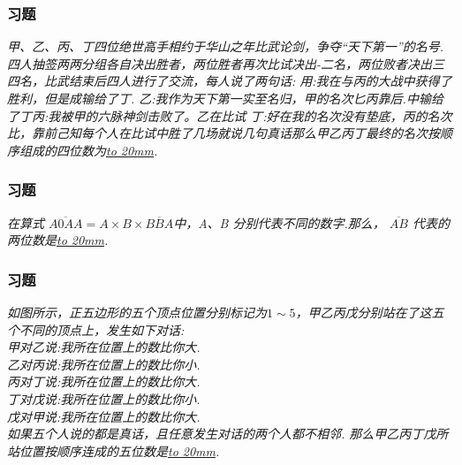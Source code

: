 \begin{frame}
    \frametitle{习题\theframecounter}
    \vspace*{-1cm}
    \textit{甲、乙、丙、丁四位绝世高手相约于华山之年比武论剑，争夺“天下第一”的名号.四人抽签两两分组各自决出胜者，两位胜者再次比试决出-二名，两位败者决出三四名，比武结束后四人进行了交流，每人说了两句话:
用:我在与丙的大战中获得了胜利，但是成输给了丁.
乙:我作为天下第一实至名归，甲的名次匕丙靠后.中输给了丁丙:我被甲的六脉神剑击败了。乙在比试
丁:好在我的名次没有垫底，丙的名次比，靠前己知每个人在比试中胜了几场就说几句真话那么甲乙丙丁最终的名次按顺序组成的四位数为\underline{\hbox to 20mm{}}.}
\end{frame}


\begin{frame}
    \frametitle{习题\theframecounter}
    \vspace*{-3cm}
    \textit{在算式 $\overline{A0AA}= A\times B\times \overline{BBA}$中，A、B 分别代表不同的数字.那么， $\overline{AB}$ 代表的两位数是\underline{\hbox to 20mm{}}.}
\end{frame}


\begin{frame}
    \frametitle{习题\theframecounter}
    \vspace*{-1cm}
    \textit{如图所示，正五边形的五个顶点位置分别标记为$1\sim 5$，甲乙丙戊分别站在了这五个不同的顶点上，发生如下对话:\\
甲对乙说:我所在位置上的数比你大. \\
乙对丙说:我所在位置上的数比你小. \\
丙对丁说:我所在位置上的数比你大. \\
丁对戊说:我所在位置上的数比你小. \\
戊对甲说:我所在位置上的数比你大. \\
如果五个人说的都是真话，且任意发生对话的两个人都不相邻. 那么甲乙丙丁戊所站位置按顺序连成的五位数是\underline{\hbox to 20mm{}}.}
\end{frame}


